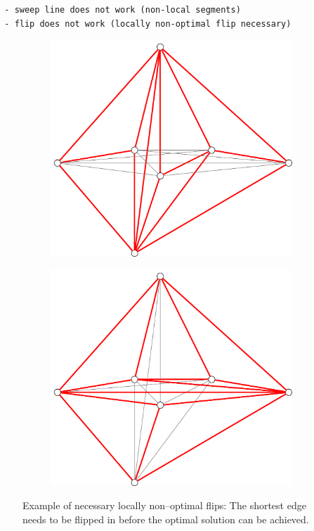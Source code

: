 \begin{verbatim}
  - sweep line does not work (non-local segments)
  - flip does not work (locally non-optimal flip necessary)
\end{verbatim}

\begin{figure}[ht]
  \centering
  \begin{subfigure}{0.4\textwidth}
    \centering
    \includegraphics[width=\textwidth]{img/nonoptimal_flips_1.pdf}
  \end{subfigure}
  \hspace{1em}
  \VRule
  \hspace{1em}
  \centering
  \begin{subfigure}{0.4\textwidth}
    \centering
    \includegraphics[width=\textwidth]{img/nonoptimal_flips_2.pdf}
  \end{subfigure}
  \caption{\label{fig:nonoptimal_flips}Example of necessary locally
    non--optimal flips: The shortest edge needs to be flipped in
    before the optimal solution can be achieved.}
\end{figure}

